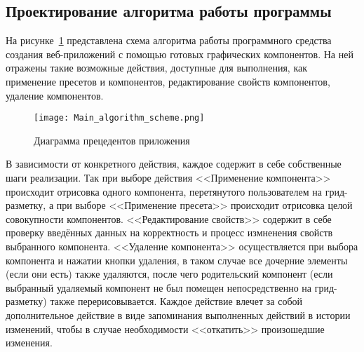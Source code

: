 \subsection{Проектирование алгоритма работы программы}
\label{sec:design:algorithm}

На рисунке~\ref{sec:design:main_algorithm_scheme} представлена схема алгоритма работы программного средства создания веб-приложений с помощью готовых графических компонентов. 
На ней отражены такие возможные действия, доступные для выполнения, как применение пресетов и компонентов, редактирование свойств компонентов, удаление компонентов. 

\begin{figure}[ht]
\centering
    \texttt{[image: Main\_algorithm\_scheme.png]}
    \caption{Диаграмма прецедентов приложения}
    \label{sec:design:main_algorithm_scheme}
\end{figure}
    
В зависимости от конкретного действия, каждое содержит в себе собственные шаги реализации. 
Так при выборе действия <<Применение компонента>> происходит отрисовка одного компонента, перетянутого пользователем на грид-разметку, а при выборе <<Применение пресета>> происходит отрисовка целой совокупности компонентов. <<Редактирование свойств>> содержит в себе проверку введённых данных на корректность и процесс измненения свойств выбранного компонента. <<Удаление компонента>> осуществляется при выбора компонента и нажатии кнопки удаления, в таком случае все дочерние элементы (если они есть) также удаляются, после чего родительский компонент (если выбранный удаляемый компонент не был помещен непосредственно на грид-разметку) также перерисовывается. Каждое действие влечет за собой дополнительное действие в виде запоминания выполненных действий в истории изменений, чтобы в случае необходимости <<откатить>> произошедшие изменения.
